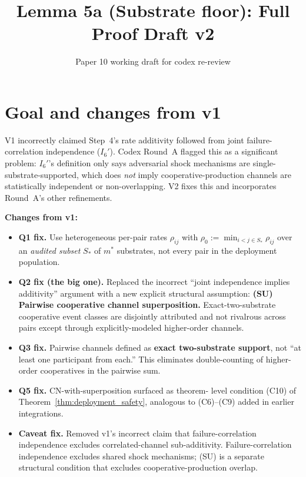 \documentclass{article}
\title{Lemma 5a (Substrate floor): Full Proof Draft v2}
\author{Paper 10 working draft for codex re-review}
\date{}
\newcommand{\Saudit}{S_*}
\begin{document}
\maketitle

\section{Goal and changes from v1}

V1 incorrectly claimed Step~4's rate additivity followed from joint
failure-correlation independence ($I_6'$).  Codex Round~A flagged
this as a significant problem: $I_6'$'s definition only says
adversarial shock mechanisms are single-substrate-supported, which
does \emph{not} imply cooperative-production channels are
statistically independent or non-overlapping.  V2 fixes this and
incorporates Round~A's other refinements.

\textbf{Changes from v1:}
\begin{itemize}
\item \textbf{Q1 fix.}  Use heterogeneous per-pair rates
  $\rho_{ij}$ with $\rho_0 := \min_{i<j \in \Saudit} \rho_{ij}$
  over an \emph{audited subset} $\Saudit$ of $m^*$ substrates,
  not every pair in the deployment population.
\item \textbf{Q2 fix (the big one).}  Replaced the incorrect
  ``joint independence implies additivity'' argument with a new
  explicit structural assumption: \textbf{(SU) Pairwise cooperative
  channel superposition.}  Exact-two-substrate cooperative event
  classes are disjointly attributed and not rivalrous across pairs
  except through explicitly-modeled higher-order channels.
\item \textbf{Q3 fix.}  Pairwise channels defined as
  \textbf{exact two-substrate support}, not ``at least one
  participant from each.''  This eliminates double-counting of
  higher-order cooperatives in the pairwise sum.
\item \textbf{Q5 fix.}  CN-with-superposition surfaced as theorem-
  level condition (C10) of Theorem~\ref{thm:deployment_safety},
  analogous to (C6)--(C9) added in earlier integrations.
\item \textbf{Caveat fix.}  Removed v1's incorrect claim that
  failure-correlation independence excludes correlated-channel
  sub-additivity.  Failure-correlation independence excludes
  shared shock mechanisms; (SU) is a separate structural condition
  that excludes cooperative-production overlap.
\end{itemize}
\end{document}
